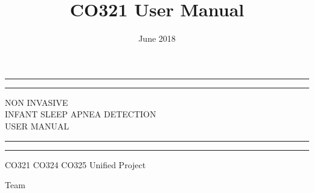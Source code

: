 \documentclass{article}
\title{CO321 User Manual}
\date{June 2018}
\begin{document}
\begin{titlepage} %

	\centering %
	
	\scshape %
	
	\vspace*{\baselineskip} %
	
	
	\rule{\textwidth}{1.6pt}\vspace*{-\baselineskip}\vspace*{2pt} %
	\rule{\textwidth}{0.4pt} %
	
	\vspace{1.5\baselineskip} %
	
	{\LARGE NON INVASIVE \\\vspace{5.0pt}INFANT SLEEP APNEA DETECTION \\ \vspace{15.0pt} USER MANUAL} %
	
	\vspace{1.5\baselineskip} %
	
	\rule{\textwidth}{0.4pt}\vspace*{-\baselineskip}\vspace{3.2pt} %
	\rule{\textwidth}{1.6pt} %
	
	\vspace{2cm} %
	
	
	CO321 CO324 CO325 Unified Project %
	
	\vspace*{6cm} %
	
	
	Team
	
	\vspace{0.5\baselineskip} %
	

\end{titlepage}
\end{document}
